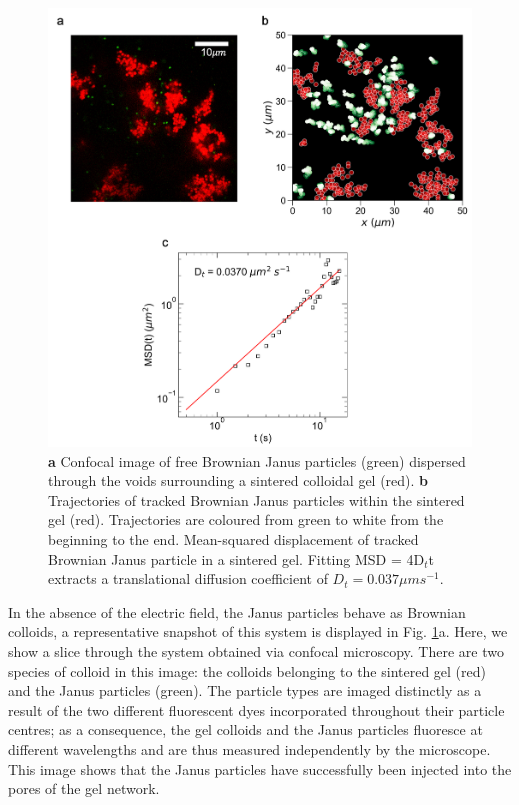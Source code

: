 \begin{figure}
	\centering
	\includegraphics[width=\linewidth]{figsExpSystem/figBrownian}
	\caption[Brownian Janus particles in a gel]{\textbf{a} Confocal image of free Brownian Janus particles (green) dispersed through the voids surrounding a sintered colloidal gel (red). \textbf{b} Trajectories of tracked Brownian Janus particles within the sintered gel (red). Trajectories are coloured from green to white from the beginning to the end.  Mean-squared displacement of tracked Brownian Janus particle in a sintered gel. Fitting MSD = 4D$_t$t extracts a translational diffusion coefficient of $D_t = 0.037 \mu m s^{-1}$.}
	\label{fig:ExpPassive}
\end{figure}


In the absence of the electric field, the Janus particles behave as Brownian colloids, a representative snapshot of this system is displayed in Fig. \ref{fig:ExpPassive}a. Here, we show a slice through the system obtained via confocal microscopy. There are two species of colloid in this image: the colloids belonging to the sintered gel (red) and the Janus particles (green). The particle types are imaged distinctly as a result of the two different fluorescent dyes incorporated throughout their particle centres; as a consequence, the gel colloids and the Janus particles fluoresce at different wavelengths and are thus measured independently by the microscope. This image shows that the Janus particles have successfully been injected into the pores of the gel network.

